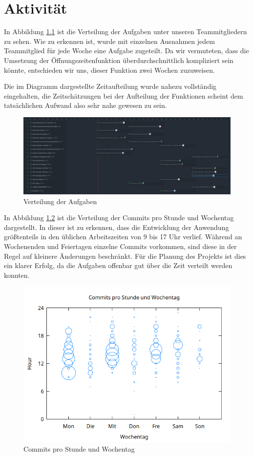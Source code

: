 
\chapter{Aktivität}
\label{chap:activity}

In Abbildung \ref{fig:tasks} ist die Verteilung der Aufgaben unter unseren Teammitgliedern zu sehen.
Wie zu erkennen ist, wurde mit einzelnen Ausnahmen jedem Teammitglied für jede Woche eine Aufgabe zugeteilt.
Da wir vermuteten, dass die Umsetzung der Öffnungszeitenfunktion überdurchschnittlich kompliziert sein könnte,
entschieden wir uns, dieser Funktion zwei Wochen zuzuweisen.

Die im Diagramm dargestellte Zeitaufteilung wurde nahezu vollständig eingehalten,
die Zeitschätzungen bei der Aufteilung der Funktionen scheint dem tatsächlichen Aufwand also sehr nahe gewesen zu sein.

\begin{figure}[ht]
    \centering
    \includegraphics[width=\textwidth]{figures/tasks}
    \caption{Verteilung der Aufgaben}
    \label{fig:tasks}
\end{figure}

In Abbildung \ref{fig:commits} ist die Verteilung der Commits pro Stunde und Wochentag dargestellt.
In dieser ist zu erkennen, dass die Entwicklung der Anwendung größtenteils in den üblichen Arbeitszeiten von 9 bis 17 Uhr verlief.
Während an Wochenenden und Feiertagen einzelne Commits vorkommen, sind diese in der Regel auf kleinere Änderungen beschränkt.
Für die Planung des Projekts ist dies ein klarer Erfolg, da die Aufgaben offenbar gut über die Zeit verteilt werden konnten.

\begin{figure}[ht]
    \centering
    \includegraphics[width=\textwidth]{figures/hours}
    \caption{Commits pro Stunde und Wochentag}
    \label{fig:commits}
\end{figure}
